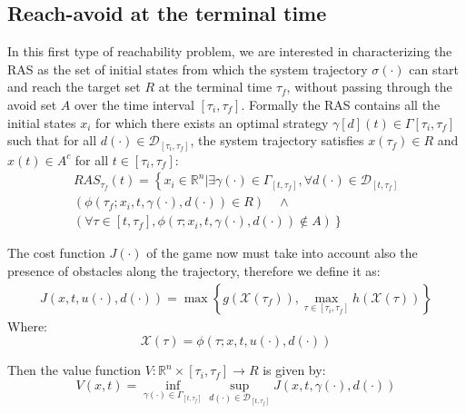 \subsection{Reach-avoid at the terminal time}
In this first type of reachability problem, we are interested in characterizing the RAS as the set of initial states from which the system trajectory $\sigma(\cdot)$ can start and reach the target set $R$ at the terminal time $\tau_f$, without passing through the avoid set $A$ over the time interval $[\tau_i, \tau_f]$. Formally the RAS contains all the initial states $x_i$ for which there exists an optimal strategy $\gamma[d](t) \in \Gamma{[\tau_i, \tau_f]}$ such that for all $d(\cdot) \in \mathcal{D}_{[\tau_i, \tau_f]}$, the system trajectory satisfies $x(\tau_f)\in R$ and $x(t) \in A^c$ for all $t \in [\tau_i, \tau_f] $:
\begin{multline}
    \label{ras_term}
    RAS_{\tau_f}(t) = 
    \left\{
        x_i \in \mathbb{R}^n | \exists \gamma(\cdot) \in \Gamma_{[t, \tau_f]},   \forall d(\cdot) \in \mathcal{D}_{[t, \tau_f]} 
    \right.\\
        (\phi(\tau_f; x_i, t, \gamma(\cdot), d(\cdot)) \in R) \quad \wedge \quad \\ (\forall \tau \in [t, \tau_f], \phi(\tau; x_i, t, \gamma(\cdot), d(\cdot)) \notin A)
    \left. 
    \right\}
\end{multline}

The cost function $J(\cdot)$ of the game now must take into account also the presence of obstacles along the trajectory, therefore we define it as:
\begin{multline}
    \label{j_ras_term}
    J(x, t, u(\cdot), d(\cdot)) =  
        \max
        \left\{
            g(\mathcal{X}(\tau_f)), 
            \max_{\tau \in [\tau_i, \tau_f]}  h(\mathcal{X}(\tau))
        \right\}
\end{multline}
Where: 
\[\mathcal{X}(\tau)=\phi(\tau; x, t, u(\cdot), d(\cdot))\]

Then the value function $V: \mathbb{R}^n \times [\tau_i, \tau_f] \rightarrow R$ is given by:
\[ V(x, t) = \inf_{\gamma(\cdot) \in \Gamma_{[t, \tau_f]}} \sup_{d(\cdot) \in \mathcal{D}_{[t, \tau_f]}} J(x, t, \gamma(\cdot), d(\cdot)) \]

